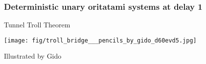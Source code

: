 %
%		
%	
%	
%          
%
%          
%            
%	          
%

\begin{frame}\frametitle{Deterministic unary oritatami systems at delay 1}
\begin{center}
Tunnel Troll Theorem
\end{center}
\begin{center}
\texttt{[image: fig/troll\_bridge\_\_\_pencils\_by\_gido\_d60evd5.jpg]}
\end{center}
\begin{flushright}
{\tiny
Illustrated by Gido
}
\end{flushright}
\end{frame}



